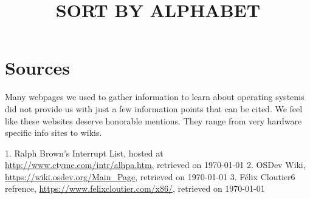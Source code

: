 \section{Sources}

Many webpages we used to gather information to learn about operating systems did not provide us with
just a few information points that can be cited. We feel like these websites deserve honorable
mentions. They range from very hardware specific info sites to wikis.

\title{SORT BY ALPHABET}

1. Ralph Brown's Interrupt List, hosted at \url{http://www.ctyme.com/intr/alhpa.htm}, retrieved on \today
2. OSDev Wiki, \url{https://wiki.osdev.org/Main_Page}, retrieved on \today
3. Félix Cloutier6 refrence, \url{https://www.felixcloutier.com/x86/}, retrieved on \today

